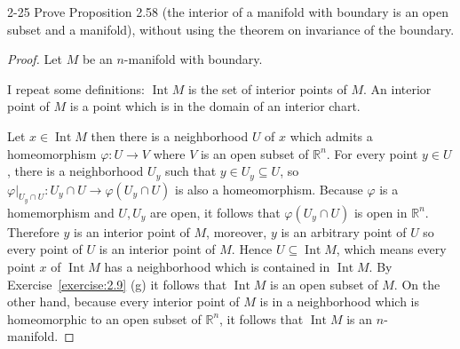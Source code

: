 \begin{problem}{2-25}
Prove Proposition 2.58 (the interior of a manifold with boundary is an open subset and a manifold), without using the theorem on invariance of the boundary.
\end{problem}

\begin{proof}
	Let $M$ be an $n$-manifold with boundary.

	I repeat some definitions: $\operatorname{Int} M$ is the set of interior points of $M$. An interior point of $M$ is a point which is in the domain of an interior chart.

	Let $x\in \operatorname{Int} M$ then there is a neighborhood $U$ of $x$ which admits a homeomorphism $\varphi: U\to V$ where $V$ is an open subset of $\mathbb{R}^{n}$. For every point $y\in U$, there is a neighborhood $U_{y}$ such that $y\in U_{y}\subseteq U$, so $\varphi\vert_{U_{y}\cap U}: U_{y}\cap U\to \varphi(U_{y}\cap U)$ is also a homeomorphism. Because $\varphi$ is a homemorphism and $U, U_{y}$ are open, it follows that $\varphi(U_{y}\cap U)$ is open in $\mathbb{R}^{n}$. Therefore $y$ is an interior point of $M$, moreover, $y$ is an arbitrary point of $U$ so every point of $U$ is an interior point of $M$. Hence $U\subseteq \operatorname{Int} M$, which means every point $x$ of $\operatorname{Int}M$ has a neighborhood which is contained in $\operatorname{Int} M$. By Exercise~\ref{exercise:2.9} (g) it follows that $\operatorname{Int} M$ is an open subset of $M$. On the other hand, because every interior point of $M$ is in a neighborhood which is homeomorphic to an open subset of $\mathbb{R}^{n}$, it follows that $\operatorname{Int} M$ is an $n$-manifold.
\end{proof}
